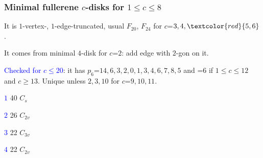 \documentclass{beamer}
\begin{document}
\begin{frame}\frametitle{Minimal fullerene 
 $c$-disks for 
$1\le c\le 8$}
\vspace{-1mm}
It is $1$-vertex-, $1$-edge-truncated, 
usual $F_{20}$, $F_{24}$ for 
 $c$=$3,4,\textcolor{red}{5,6}$.

It comes from minimal $4$-disk for $c$=$2$: add edge with $2$-gon on it.

\textcolor{blue}{Checked for $c$$\le$$20$}: it has $p_6$=$14,6,3,2,0,1,3,4,6,7,8,5$ 
and
=$6$ 
if 
$1$$\le$$ c$$\le$$ 12$ 
and $c$$\geq$$ 13$. Unique unless
$2,3,10$ 
for $c$=$9,10,11$.



\begin{center}
\begin{minipage}[b]{17mm}\centering
{}\par
\textcolor{blue}{$1$} 40 $C_s$  
\end{minipage}
\begin{minipage}[b]{17mm}
\centering
{}\par
\textcolor{blue}{$2$} 26 $C_{2v}$
\end{minipage}
\begin{minipage}[b]{17mm}
\centering
{}\par
\textcolor{blue}{$3$} 22 $C_{3v}$
\end{minipage}
\begin{minipage}[b]{17mm}
\centering   
{}\par
\textcolor{blue}{$4$} 22 $C_{2v}$
\end{minipage}
\end{center}
\vspace{-2mm}



\end{frame}
\end{document}
